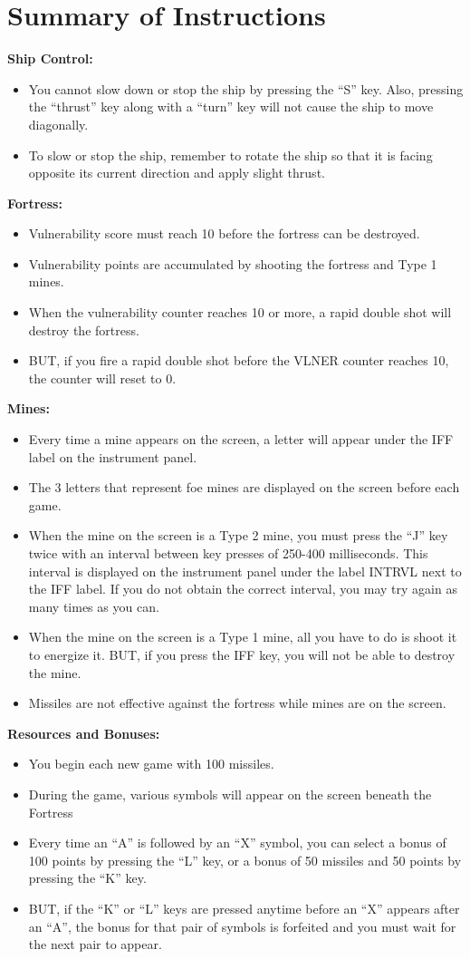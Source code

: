 \documentclass[letterpaper,12pt]{article}
\begin{document}
\section{Summary of Instructions}
\noindent
\textbf{Ship Control:}
\begin{itemize}
\item You cannot slow down or stop the ship by pressing the “S” key. Also, pressing the
“thrust” key along with a “turn” key will not cause the ship to move diagonally.
\item To slow or stop the ship, remember to rotate the ship so that it is facing opposite its
current direction and apply slight thrust.
\end{itemize}
\textbf{Fortress:}
\begin{itemize}
\item Vulnerability score must reach 10 before the fortress can be destroyed.
\item Vulnerability points are accumulated by shooting the fortress and Type 1 mines.
\item When the vulnerability counter reaches 10 or more, a rapid double shot will destroy the
fortress.
\item BUT, if you fire a rapid double shot before the VLNER counter reaches 10, the counter
will reset to 0.
\end{itemize}
\textbf{Mines:}
\begin{itemize}
\item Every time a mine appears on the screen, a letter will appear under the IFF label on the
instrument panel.
\item The 3 letters that represent foe mines are displayed on the screen before each game.
\item When the mine on the screen is a Type 2 mine, you must press the “J” key twice with
an interval between key presses of 250-400 milliseconds. This interval is displayed on
the instrument panel under the label INTRVL next to the IFF label. If you do not obtain
the correct interval, you may try again as many times as you can.
\item When the mine on the screen is a Type 1 mine, all you have to do is shoot it to energize
it. BUT, if you press the IFF key, you will not be able to destroy the mine.
\item Missiles are not effective against the fortress while mines are on the screen.
\end{itemize}
\textbf{Resources and Bonuses:}
\begin{itemize}
\item You begin each new game with 100 missiles.
\item During the game, various symbols will appear on the screen beneath the Fortress
\item Every time an “A” is followed by an “X” symbol, you can select a bonus of 100 points
by pressing the “L” key, or a bonus of 50 missiles and 50 points by pressing the “K”
key.
\item BUT, if the “K” or “L” keys are pressed anytime before an “X” appears after an “A”,
the bonus for that pair of symbols is forfeited and you must wait for the next pair to
appear.
\end{itemize}
\end{document}
